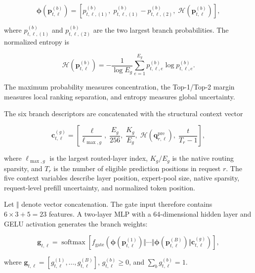 \documentclass[conference]{IEEEtran}
\begin{document}
\begin{equation}
\boldsymbol{\phi}
\left(
\mathbf{p}_{t,\ell}^{(b)}
\right)
=
\left[
p_{t,\ell,(1)}^{(b)},
\;
p_{t,\ell,(1)}^{(b)}
-
p_{t,\ell,(2)}^{(b)},
\;
\mathcal{H}
\left(
\mathbf{p}_{t,\ell}^{(b)}
\right)
\right],
\label{eq:branch-descriptor}
\end{equation}

where \(p_{t,\ell,(1)}^{(b)}\) and
\(p_{t,\ell,(2)}^{(b)}\) are the two largest branch probabilities.
The normalized entropy is

\begin{equation}
\mathcal{H}
\left(
\mathbf{p}_{t,\ell}^{(b)}
\right)
=
-
\frac{1}{\log E_g}
\sum_{e=1}^{E_g}
p_{t,\ell,e}^{(b)}
\log p_{t,\ell,e}^{(b)}.
\label{eq:branch-entropy}
\end{equation}

The maximum probability measures concentration, the Top-1/Top-2 margin
measures local ranking separation, and entropy measures global uncertainty.

The six branch descriptors are concatenated with the structural context vector

\begin{equation}
\mathbf{c}_{t,\ell}^{(g)}
=
\left[
\frac{\ell}{\ell_{\max,g}},
\;
\frac{E_g}{256},
\;
\frac{K_g}{E_g},
\;
\mathcal{H}
\left(
\mathbf{q}_{r,\ell}^{\mathrm{pre}}
\right),
\;
\frac{t}{T_r-1}
\right],
\label{eq:structural-context}
\end{equation}

where \(\ell_{\max,g}\) is the largest routed-layer index,
\(K_g/E_g\) is the native routing sparsity, and \(T_r\) is the number of
eligible prediction positions in request \(r\). The five context variables
describe layer position, expert-pool size, native sparsity, request-level
prefill uncertainty, and normalized token position.

Let \(\Vert\) denote vector concatenation. The gate input therefore contains
\(6\times3+5=23\) features. A two-layer MLP with a 64-dimensional hidden
layer and GELU activation generates the branch weights:

\begin{equation}
\mathbf{g}_{t,\ell}
=
\operatorname{softmax}
\left[
f_{\mathrm{gate}}
\left(
\boldsymbol{\phi}(\mathbf{p}_{t,\ell}^{(1)})
\Vert\cdots\Vert
\boldsymbol{\phi}(\mathbf{p}_{t,\ell}^{(B)})
\Vert
\mathbf{c}_{t,\ell}^{(g)}
\right)
\right],
\label{eq:gating-network}
\end{equation}

where
\(\mathbf{g}_{t,\ell}
=[g_{t,\ell}^{(1)},\ldots,g_{t,\ell}^{(B)}]\),
\(g_{t,\ell}^{(b)}\geq0\), and
\(\sum_b g_{t,\ell}^{(b)}=1\).
\end{document}
